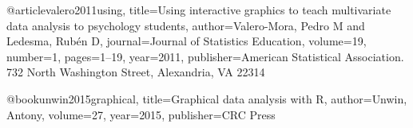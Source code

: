 @article{valero2011using,
  title={Using interactive graphics to teach multivariate data analysis to psychology students},
  author={Valero-Mora, Pedro M and Ledesma, Rub{\'e}n D},
  journal={Journal of Statistics Education},
  volume={19},
  number={1},
  pages={1--19},
  year={2011},
  publisher={American Statistical Association. 732 North Washington Street, Alexandria, VA 22314}
}

@book{unwin2015graphical,
	title={Graphical data analysis with R},
	author={Unwin, Antony},
	volume={27},
	year={2015},
	publisher={CRC Press}
}
